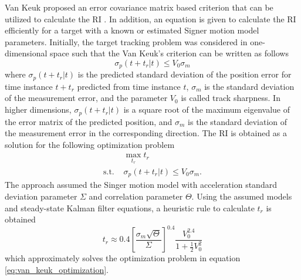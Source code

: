 \documentclass[english, 12pt, a4paper, elec, utf8, a-1b, online]{aaltothesis}
\newcommand{\ri}{t_r}
\begin{document}
Van Keuk proposed an error covariance matrix based criterion that can be utilized to calculate the RI \cite{Keuk1975}.
In addition, an equation is given to calculate the RI efficiently for a target with a known or estimated Signer motion model \cite{RongLi2003} parameters.
Initially, the target tracking problem was considered in one-dimensional space such that the Van Keuk's criterion can be written as follows
\begin{equation}\label{eq:criterion}
    \sigma_p(t + \ri | t) \leq V_0 \sigma_m
\end{equation}
where $\sigma_p(t + \ri | t)$ is the predicted standard deviation of the position error for time instance $t+\ri$ predicted from time instance $t$, $\sigma_m$ is the standard deviation of the measurement error, and the parameter $V_0$ is called track sharpness.
In higher dimensions, $\sigma_p(t + \ri | t)$ is a square root of the maximum eigenvalue of the error matrix of the predicted position, and $\sigma_m$ is the standard deviation of the measurement error in the corresponding direction.
The RI is obtained as a solution for the following optimization problem
\begin{equation}\label{eq:van_keuk_optimization}
\begin{array}{ll}
     & \max_{\ri} \ri \\[7pt]
    \text{s.t. } &\sigma_p(t + \ri | t) \leq V_0 \sigma_m. 
\end{array}
\end{equation}
The approach assumed the Singer motion model with acceleration standard deviation parameter $\Sigma$ and correlation parameter $\Theta$.
Using the assumed models and steady-state Kalman filter equations, a heuristic rule to calculate $\ri$ is obtained
\begin{equation}\label{eq:keuk_time}
    \ri \approx 0.4 \left[ \frac{\sigma_m \sqrt{\Theta}}{\Sigma} \right]^{0.4} \frac{V_0^{2.4}}{1+\frac{1}{2}V_0^2}
\end{equation}
which approximately solves the optimization problem in equation \eqref{eq:van_keuk_optimization}.
\end{document}
